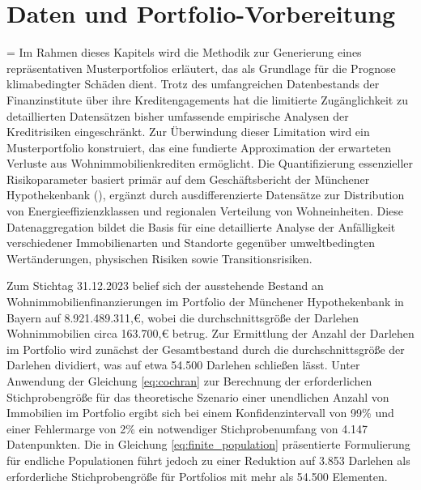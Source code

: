 \section{Daten und Portfolio-Vorbereitung}

\begin{sloppypar}
\emergencystretch=\hsize
Im Rahmen dieses Kapitels wird die Methodik zur Generierung eines repräsentativen Musterportfolios erläutert, das als Grundlage für die Prognose klimabedingter Schäden dient. Trotz des umfangreichen Datenbestands der Finanzinstitute über ihre Kredit\-engagements hat die limitierte Zugänglichkeit zu detaillierten Datensätzen bisher umfassende empirische Analysen der Kreditrisiken eingeschränkt. Zur Überwindung dieser Limitation wird ein Musterportfolio konstruiert, das eine fundierte Approximation der erwarteten Verluste aus Wohn\-immobilien\-krediten ermöglicht. Die Quantifizierung essenzieller Risikoparameter basiert primär auf dem Geschäftsbericht der Münchener Hypothekenbank (\cite{MuenchenerHyp2022}), ergänzt durch ausdifferenzierte Datensätze zur Distribution von Energie\-effizienz\-klassen und regionalen Verteilung von Wohneinheiten. Diese Datenaggregation bildet die Basis für eine detaillierte Analyse der Anfälligkeit verschiedener Immobilienarten und Standorte gegenüber umweltbedingten Wert\-änderungen, physischen Risiken sowie Transitions\-risiken.

Zum Stichtag 31.12.2023 belief sich der ausstehende Bestand an Wohnimmobilienfinanzierungen im Portfolio der Münchener Hypothekenbank in Bayern auf 8.921.489.311,€, wobei die durchschnittsgröße der Darlehen Wohnimmobilien circa 163.700,€ betrug. Zur Ermittlung der Anzahl der Darlehen im Portfolio wird zunächst der Gesamtbestand durch die durchschnittsgröße der Darlehen dividiert, was auf etwa 54.500 Darlehen schließen lässt.
Unter Anwendung der Gleichung \ref{eq:cochran} zur Berechnung der erforderlichen Stichprobengröße für das theoretische Szenario einer unendlichen Anzahl von Immobilien im Portfolio ergibt sich bei einem Konfidenzintervall von 99\% und einer Fehlermarge von 2\% ein notwendiger Stichprobenumfang von 4.147 Datenpunkten. Die in Gleichung \ref{eq:finite_population} präsentierte Formulierung für endliche Populationen führt jedoch zu einer Reduktion auf 3.853 Darlehen als erforderliche Stichprobengröße für Portfolios mit mehr als 54.500 Elementen.


\end{sloppypar}
